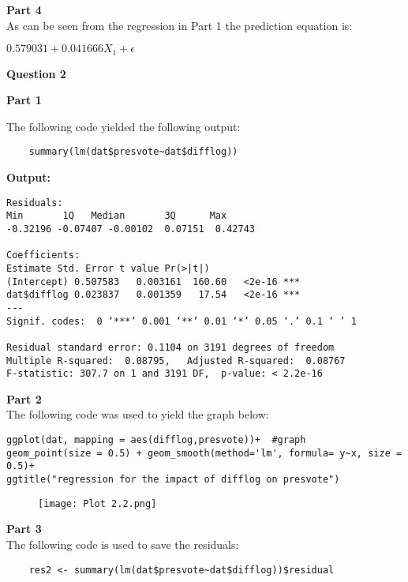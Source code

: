 \documentclass{article}
\begin{document}
\textbf{\large Part 4\\}
As can be seen from the regression in Part 1 the prediction equation is:
\begin{center}
	$ 0.579031 + 0.041666X_{1} + \epsilon $
\end{center} 
\pagebreak

	\textbf{\Large Question 2\\}
	
\noindent\textbf{\large Part 1\\}

The following code yielded the following output:\\
\begin{verbatim}
	summary(lm(dat$presvote~dat$difflog))
\end{verbatim}
\textbf{Output:}
\begin{verbatim}
Residuals:
Min       1Q   Median       3Q      Max 
-0.32196 -0.07407 -0.00102  0.07151  0.42743 

Coefficients:
Estimate Std. Error t value Pr(>|t|)    
(Intercept) 0.507583   0.003161  160.60   <2e-16 ***
dat$difflog 0.023837   0.001359   17.54   <2e-16 ***
---
Signif. codes:  0 ‘***’ 0.001 ‘**’ 0.01 ‘*’ 0.05 ‘.’ 0.1 ‘ ’ 1

Residual standard error: 0.1104 on 3191 degrees of freedom
Multiple R-squared:  0.08795,	Adjusted R-squared:  0.08767 
F-statistic: 307.7 on 1 and 3191 DF,  p-value: < 2.2e-16
\end{verbatim}


\textbf{\large Part 2\\}
The following code was used to yield the graph below:\\
\begin{verbatim}
ggplot(dat, mapping = aes(difflog,presvote))+  #graph
geom_point(size = 0.5) + geom_smooth(method='lm', formula= y~x, size = 0.5)+
ggtitle("regression for the impact of difflog on presvote")
\end{verbatim}
\pagebreak
\begin{figure}[h]
	\centering
	\graphicspath{ {c:/Users/User/Documents/PostGrad/Stats/Assignment 3\Assignment 3} }
	\texttt{[image: Plot 2.2.png]}
	
\end{figure}





\textbf{\large Part 3\\}
The following code is used to save the residuals:
\begin{verbatim}
	res2 <- summary(lm(dat$presvote~dat$difflog))$residual
\end{verbatim}
\end{document}
